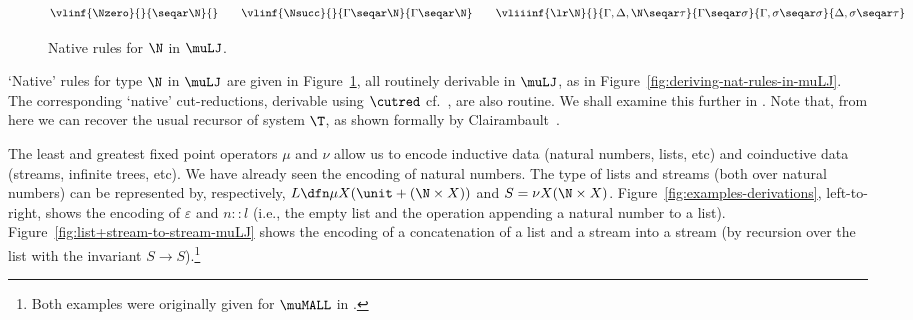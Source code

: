 \begin{figure}
    \[
    \vlinf{\Nzero}{}{\seqar \N}{}
    \qquad 
    \vlinf{\Nsucc}{}{\Gamma \seqar \N}{\Gamma \seqar \N}
    \qquad
    \vliiinf{\lr \N}{}{\Gamma,\Delta, \N \seqar \tau}{\Gamma \seqar \sigma}{\Gamma, \sigma \seqar \sigma}{\Delta, \sigma \seqar \tau}
    \]
    \caption{Native rules for $\N$ in $\muLJ$.}
    \label{fig:native-n-rules-mulj}
\end{figure}
\begin{example}
    `Native' rules for type $\N$ in $\muLJ$ are given in Figure~\ref{fig:native-n-rules-mulj}, all routinely derivable in $\muLJ$, as in Figure~\ref{fig:deriving-nat-rules-in-muLJ}.
    The corresponding `native' cut-reductions, derivable using $\cutred$ cf.~, are also routine.
    We shall examine this further in .
    Note that, from here we can recover the usual recursor of system $\T$, as shown formally by Clairambault~\cite{Clairambault13interleaving}.
\end{example}




\begin{example}\label{exmp:examples-of-derivations}
The least and greatest fixed point operators $\mu$ and $\nu$ allow us to encode inductive data (natural numbers, lists, etc) and coinductive data (streams, infinite trees, etc). We have already seen the encoding of natural numbers. The type of lists and streams (both over natural numbers) can be represented by, respectively,  $L\dfn \mu X (\unit + (\N \times X))$ and $S= \nu X (\N \times X)$.
Figure~\ref{fig:examples-derivations}, left-to-right, shows the encoding of  $\varepsilon$ and $n::l$ (i.e., the empty list and the operation appending  a natural number to a list). 
Figure~\ref{fig:list+stream-to-stream-muLJ} shows the encoding of a concatenation of a list and a stream into a stream (by recursion over the list with the invariant $S \to S$).\footnote{Both examples were originally given for $\muMALL$ in \cite{Doumane17thesis}.}
\end{example}

